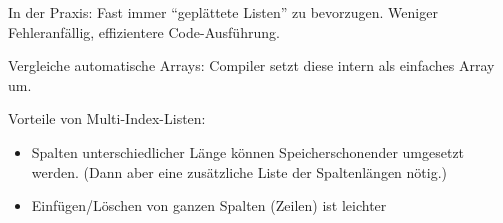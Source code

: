 
\begin{frame}
%
\begin{hintbox}
In der Praxis: Fast immer \enquote{geplättete Listen} zu bevorzugen. Weniger Fehleranfällig, effizientere Code-Ausführung.

Vergleiche automatische Arrays: Compiler setzt diese intern als einfaches Array um.

\vspace{6pt}
Vorteile von Multi-Index-Listen:
\begin{itemize}
\item Spalten unterschiedlicher Länge können Speicherschonender umgesetzt werden. (Dann aber eine zusätzliche Liste der Spaltenlängen nötig.)
\item Einfügen/Löschen von ganzen Spalten (Zeilen) ist leichter
\end{itemize}

\end{hintbox}
%
\end{frame}


